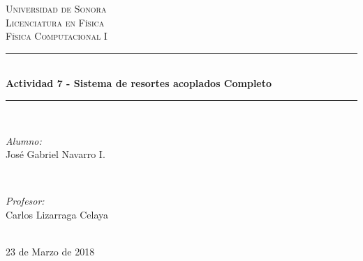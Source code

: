 \documentclass[12pt]{article}
\begin{document}
\begin{titlepage}

\newcommand{\HRule}{\rule{\linewidth}{0.5mm}} %

\center 

\textsc{\LARGE Universidad de Sonora}\\[1.5cm]
\textsc{\Large Licenciatura en Física}\\[0.5cm]
\textsc{\large Física Computacional I}\\[0.5cm]


\HRule \\[0.4cm]
{\huge \bfseries Actividad 7 - Sistema de resortes acoplados Completo}\\[0.4cm] %
\HRule \\[1.5cm]
 

\begin{minipage}{0.4\textwidth}
\begin{flushleft} \large
\emph{Alumno:}\\
José Gabriel Navarro I.
\end{flushleft}
\end{minipage}
~
\begin{minipage}{0.4\textwidth}
\begin{flushright} \large
\emph{Profesor:} \\
Carlos Lizarraga Celaya
\end{flushright}
\end{minipage}\\[2cm]


23 de Marzo de 2018



\end{titlepage}
\end{document}
